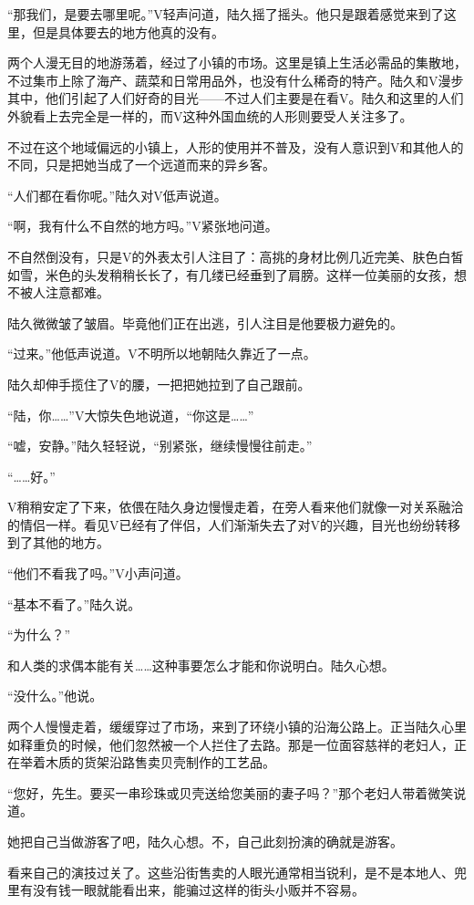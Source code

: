 “那我们，是要去哪里呢。”V轻声问道，陆久摇了摇头。他只是跟着感觉来到了这里，但是具体要去的地方他真的没有。

两个人漫无目的地游荡着，经过了小镇的市场。这里是镇上生活必需品的集散地，不过集市上除了海产、蔬菜和日常用品外，也没有什么稀奇的特产。陆久和V漫步其中，他们引起了人们好奇的目光——不过人们主要是在看V。陆久和这里的人们外貌看上去完全是一样的，而V这种外国血统的人形则要受人关注多了。

不过在这个地域偏远的小镇上，人形的使用并不普及，没有人意识到V和其他人的不同，只是把她当成了一个远道而来的异乡客。

“人们都在看你呢。”陆久对V低声说道。

“啊，我有什么不自然的地方吗。”V紧张地问道。

不自然倒没有，只是V的外表太引人注目了：高挑的身材比例几近完美、肤色白皙如雪，米色的头发稍稍长长了，有几缕已经垂到了肩膀。这样一位美丽的女孩，想不被人注意都难。

陆久微微皱了皱眉。毕竟他们正在出逃，引人注目是他要极力避免的。

“过来。”他低声说道。V不明所以地朝陆久靠近了一点。

陆久却伸手揽住了V的腰，一把把她拉到了自己跟前。

“陆，你……”V大惊失色地说道，“你这是……”

“嘘，安静。”陆久轻轻说，“别紧张，继续慢慢往前走。”

“……好。”

V稍稍安定了下来，依偎在陆久身边慢慢走着，在旁人看来他们就像一对关系融洽的情侣一样。看见V已经有了伴侣，人们渐渐失去了对V的兴趣，目光也纷纷转移到了其他的地方。

“他们不看我了吗。”V小声问道。

“基本不看了。”陆久说。

“为什么？”

和人类的求偶本能有关……这种事要怎么才能和你说明白。陆久心想。

“没什么。”他说。

两个人慢慢走着，缓缓穿过了市场，来到了环绕小镇的沿海公路上。正当陆久心里如释重负的时候，他们忽然被一个人拦住了去路。那是一位面容慈祥的老妇人，正在举着木质的货架沿路售卖贝壳制作的工艺品。

“您好，先生。要买一串珍珠或贝壳送给您美丽的妻子吗？”那个老妇人带着微笑说道。

她把自己当做游客了吧，陆久心想。不，自己此刻扮演的确就是游客。

看来自己的演技过关了。这些沿街售卖的人眼光通常相当锐利，是不是本地人、兜里有没有钱一眼就能看出来，能骗过这样的街头小贩并不容易。


